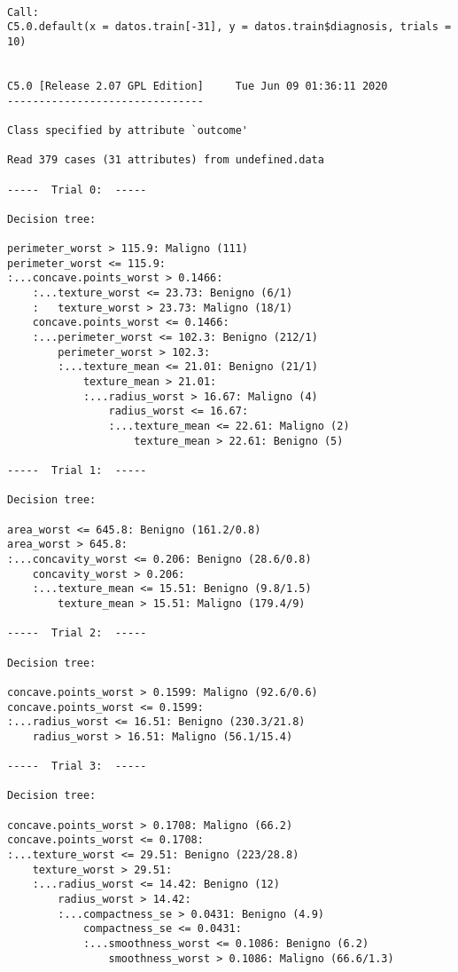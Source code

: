 \documentclass[
]{article}
\begin{document}
\begin{verbatim}

Call:
C5.0.default(x = datos.train[-31], y = datos.train$diagnosis, trials = 10)


C5.0 [Release 2.07 GPL Edition]     Tue Jun 09 01:36:11 2020
-------------------------------

Class specified by attribute `outcome'

Read 379 cases (31 attributes) from undefined.data

-----  Trial 0:  -----

Decision tree:

perimeter_worst > 115.9: Maligno (111)
perimeter_worst <= 115.9:
:...concave.points_worst > 0.1466:
    :...texture_worst <= 23.73: Benigno (6/1)
    :   texture_worst > 23.73: Maligno (18/1)
    concave.points_worst <= 0.1466:
    :...perimeter_worst <= 102.3: Benigno (212/1)
        perimeter_worst > 102.3:
        :...texture_mean <= 21.01: Benigno (21/1)
            texture_mean > 21.01:
            :...radius_worst > 16.67: Maligno (4)
                radius_worst <= 16.67:
                :...texture_mean <= 22.61: Maligno (2)
                    texture_mean > 22.61: Benigno (5)

-----  Trial 1:  -----

Decision tree:

area_worst <= 645.8: Benigno (161.2/0.8)
area_worst > 645.8:
:...concavity_worst <= 0.206: Benigno (28.6/0.8)
    concavity_worst > 0.206:
    :...texture_mean <= 15.51: Benigno (9.8/1.5)
        texture_mean > 15.51: Maligno (179.4/9)

-----  Trial 2:  -----

Decision tree:

concave.points_worst > 0.1599: Maligno (92.6/0.6)
concave.points_worst <= 0.1599:
:...radius_worst <= 16.51: Benigno (230.3/21.8)
    radius_worst > 16.51: Maligno (56.1/15.4)

-----  Trial 3:  -----

Decision tree:

concave.points_worst > 0.1708: Maligno (66.2)
concave.points_worst <= 0.1708:
:...texture_worst <= 29.51: Benigno (223/28.8)
    texture_worst > 29.51:
    :...radius_worst <= 14.42: Benigno (12)
        radius_worst > 14.42:
        :...compactness_se > 0.0431: Benigno (4.9)
            compactness_se <= 0.0431:
            :...smoothness_worst <= 0.1086: Benigno (6.2)
                smoothness_worst > 0.1086: Maligno (66.6/1.3)


\end{verbatim}
\end{document}
